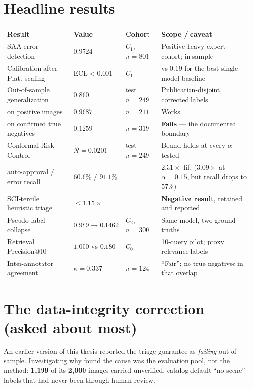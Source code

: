\documentclass[10pt,a4paper]{article}
\newcommand{\num}[1]{\textbf{#1}}
\begin{document}
\section{Headline results}
\begin{center}\footnotesize
\begin{tabular}{p{5.6cm} l l p{5.4cm}}
\toprule
\textbf{Result} & \textbf{Value} & \textbf{Cohort} & \textbf{Scope / caveat} \\
\midrule
SAA error detection & $0.9724$ & $C_1$, $n{=}801$ & Positive-heavy expert cohort; in-sample \\
Calibration after Platt scaling & $\text{ECE}<0.001$ & $C_1$ & vs $0.19$ for the best single-model baseline \\
Out-of-sample generalization & $0.860$ & test $n{=}249$ & Publication-disjoint, corrected labels \\
\quad on positive images & $0.9687$ & $n{=}211$ & Works \\
\quad on confirmed true negatives & $0.1259$ & $n{=}319$ & \textbf{Fails} --- the documented boundary \\
Conformal Risk Control & $\mathcal{R}=0.0201$ & test $n{=}249$ & Bound holds at every $\alpha$ tested \\
\quad auto-approval / error recall & $60.6\%$ / $91.1\%$ & & $2.31\times$ lift ($3.09\times$ at $\alpha{=}0.15$, but recall drops to $57\%$) \\
SCI-tercile heuristic triage & $\le 1.15\times$ & & \textbf{Negative result}, retained and reported \\
Pseudo-label collapse & $0.989\!\to\!0.1462$ & $C_2$, $n{=}300$ & Same model, two ground truths \\
Retrieval Precision@10 & $1.000$ vs $0.180$ & $C_0$ & 10-query pilot; proxy relevance labels \\
Inter-annotator agreement & $\kappa=0.337$ & $n{=}124$ & ``Fair''; no true negatives in that overlap \\
\bottomrule
\end{tabular}
\end{center}

\section{The data-integrity correction (asked about most)}
An earlier version of this thesis reported the triage guarantee as \emph{failing} out-of-sample. Investigating why found the cause was the evaluation pool, not the method: \num{1{,}199} of its \num{2{,}000} images carried unverified, catalog-default ``no scene'' labels that had never been through human review.
\end{document}
